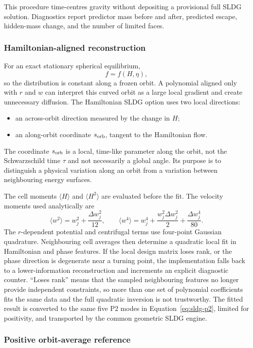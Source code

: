 This procedure time-centres gravity without depositing a provisional full
SLDG solution.  Diagnostics report predictor mass before and after, predicted
escape, hidden-mass change, and the number of limited faces.

\subsubsection{Hamiltonian-aligned reconstruction}

For an exact stationary spherical equilibrium,
\[
 f=f(H,\eta),
\]
so the distribution is constant along a frozen orbit.  A polynomial aligned
only with \(r\) and \(w\) can interpret this curved orbit as a large local
gradient and create unnecessary diffusion.  The Hamiltonian SLDG option uses
two local directions:
\begin{itemize}
\item an across-orbit direction measured by the change in \(H\);
\item an along-orbit coordinate \(s_{\rm orb}\), tangent to the Hamiltonian
      flow.
\end{itemize}
The coordinate \(s_{\rm orb}\) is a local, time-like parameter along the
orbit, not the Schwarzschild time \(\tau\) and not necessarily a global angle.
Its purpose is to distinguish a physical variation along an orbit from a
variation between neighbouring energy surfaces.

The cell moments
\(\langle H\rangle\) and \(\langle H^2\rangle\) are evaluated before the fit.
The velocity moments used analytically are
\[
 \langle w^2\rangle=w_j^2+\frac{\Delta w_j^2}{12},
\qquad
 \langle w^4\rangle=w_j^4+
 \frac{w_j^2\Delta w_j^2}{2}+\frac{\Delta w_j^4}{80}.
\]
The \(r\)-dependent potential and centrifugal terms use four-point Gaussian
quadrature.  Neighbouring cell averages then determine a quadratic local fit
in Hamiltonian and phase features.  If the local design matrix loses rank, or
the phase direction is degenerate near a turning point, the implementation
falls back to a lower-information reconstruction and increments an explicit
diagnostic counter.  ``Loses rank'' means that the sampled neighbouring
features no longer provide independent constraints, so more than one set of
polynomial coefficients fits the same data and the full quadratic inversion
is not trustworthy.  The fitted result is converted to the same five P2 modes
in Equation~\eqref{eq:sldg-p2}, limited for positivity, and transported by the
common geometric SLDG engine.

\subsubsection{Positive orbit-average reference}

